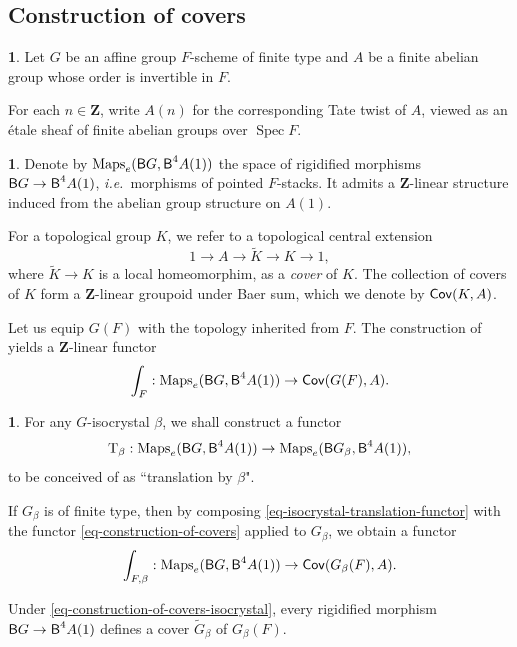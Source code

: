 \documentclass[10pt,english,reqno]{amsart}
\newcommand{\integers}{\mathbf Z}
\newcommand{\Maps}{\operatorname{Maps}}
\newcommand{\Cov}{\textnormal{\textsf{Cov}}}
\newcommand{\deloop}{\textnormal{\textsf{B}}}
\newcommand{\Spec}{\operatorname{Spec}}
\newcommand{\Translation}{\mathrm{T}}
\theoremstyle{definition}
\numberwithin{equation}{section}
\newtheorem{untitledsubsubsection}[subsubsection]{}
\newenvironment{void}
{\begin{untitledsubsubsection}}
{\end{untitledsubsubsection}}
\begin{document}


\subsection{Construction of covers}
\label{sec-construction-of-covers}

\begin{void}
Let $G$ be an affine group $F$-scheme of finite type and $A$ be a finite abelian group whose order is invertible in $F$.

For each $n\in\integers$, write $A(n)$ for the corresponding Tate twist of $A$, viewed as an \'etale sheaf of finite abelian groups over $\Spec F$.
\end{void}


\begin{void}
Denote by $\Maps_e(\deloop G, \deloop^4A(1))$ the space of rigidified morphisms $\deloop G \rightarrow \deloop^4A(1)$, \emph{i.e.}~morphisms of pointed $F$-stacks. It admits a $\integers$-linear structure induced from the abelian group structure on $A(1)$.

For a topological group $K$, we refer to a topological central extension
$$
1 \rightarrow A \rightarrow \widetilde K \rightarrow K \rightarrow 1,
$$
where $\widetilde K \rightarrow K$ is a local homeomorphim, as a \emph{cover} of $K$. The collection of covers of $K$ form a $\integers$-linear groupoid under Baer sum, which we denote by $\Cov(K, A)$.

Let us equip $G(F)$ with the topology inherited from $F$. The construction of \cite[\S2.1]{zhao2022metaplectic} yields a $\integers$-linear functor
\begin{equation}
\label{eq-construction-of-covers}
\int_F : \Maps_e(\deloop G, \deloop^4A(1)) \rightarrow \Cov(G(F), A).
\end{equation}
\end{void}


\begin{void}
\label{void-isocrystal-translation-functor}
For any $G$-isocrystal $\beta$, we shall construct a functor
\begin{equation}
\label{eq-isocrystal-translation-functor}
\Translation_{\beta} : \Maps_e(\deloop G, \deloop^4A(1)) \rightarrow \Maps_e(\deloop G_{\beta}, \deloop^4A(1)),
\end{equation}
to be conceived of as ``translation by $\beta$".

If $G_{\beta}$ is of finite type, then by composing \eqref{eq-isocrystal-translation-functor} with the functor \eqref{eq-construction-of-covers} applied to $G_{\beta}$, we obtain a functor
\begin{equation}
\label{eq-construction-of-covers-isocrystal}
	\int_{F, \beta} : \Maps_e(\deloop G, \deloop^4A(1)) \rightarrow \Cov(G_{\beta}(F), A).
\end{equation}

Under \eqref{eq-construction-of-covers-isocrystal}, every rigidified morphism $\deloop G \rightarrow \deloop^4A(1)$ defines a cover $\widetilde G_{\beta}$ of $G_{\beta}(F)$.
\end{void}
\end{document}
